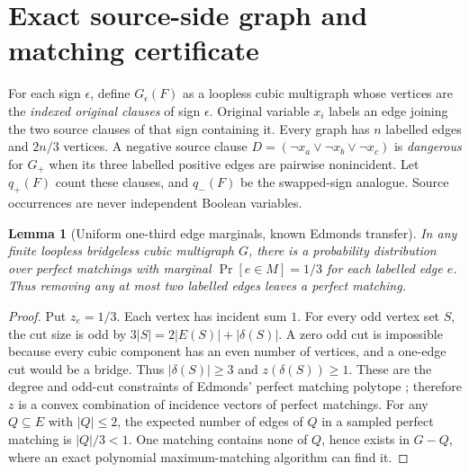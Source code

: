 \documentclass[11pt]{article}
\newtheorem{lemma}[theorem]{Lemma}
\begin{document}
\section{Exact source-side graph and matching certificate}
For each sign $\epsilon$, define $G_\epsilon(F)$ as a loopless cubic multigraph whose vertices are the \emph{indexed original clauses} of sign $\epsilon$. Original variable $x_i$ labels an edge joining the two source clauses of that sign containing it. Every graph has $n$ labelled edges and $2n/3$ vertices. A negative source clause $D=(\neg x_a\vee\neg x_b\vee\neg x_c)$ is \emph{dangerous} for $G_+$ when its three labelled positive edges are pairwise nonincident. Let $q_+(F)$ count these clauses, and $q_-(F)$ be the swapped-sign analogue. Source occurrences are never independent Boolean variables.

\begin{lemma}[Uniform one-third edge marginals, known Edmonds transfer]
In any finite loopless bridgeless cubic multigraph $G$, there is a probability distribution over perfect matchings with marginal $\Pr[e\in M]=1/3$ for each \emph{labelled} edge $e$. Thus removing any at most two labelled edges leaves a perfect matching.
\end{lemma}
\begin{proof}
Put $z_e=1/3$. Each vertex has incident sum $1$. For every odd vertex set $S$, the cut size is odd by $3|S|=2|E(S)|+|\delta(S)|$. A zero odd cut is impossible because every cubic component has an even number of vertices, and a one-edge cut would be a bridge. Thus $|\delta(S)|\ge3$ and $z(\delta(S))\ge1$. These are the degree and odd-cut constraints of Edmonds' perfect matching polytope \cite{edmonds}; therefore $z$ is a convex combination of incidence vectors of perfect matchings. For any $Q\subseteq E$ with $|Q|\le2$, the expected number of edges of $Q$ in a sampled perfect matching is $|Q|/3<1$. One matching contains none of $Q$, hence exists in $G-Q$, where an exact polynomial maximum-matching algorithm can find it.
\end{proof}
\end{document}
